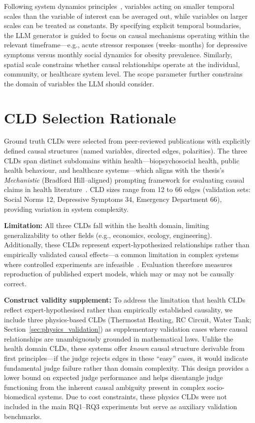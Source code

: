 Following system dynamics principles~\cite{sterman2002system}, variables acting on smaller temporal scales than the variable of interest can be averaged out, while variables on larger scales can be treated as constants. By specifying explicit temporal boundaries, the LLM generator is guided to focus on causal mechanisms operating within the relevant timeframe---e.g., acute stressor responses (weeks--months) for depressive symptoms versus monthly social dynamics for obesity prevalence. Similarly, spatial scale constrains whether causal relationships operate at the individual, community, or healthcare system level. The scope parameter further constrains the domain of variables the LLM should consider.

\section{CLD Selection Rationale}
Ground truth CLDs were selected from peer-reviewed publications with explicitly defined causal structures (named variables, directed edges, polarities). The three CLDs span distinct subdomains within health---biopsychosocial health, public health behaviour, and healthcare systems---which aligns with the thesis's \textit{Mechanistic} (Bradford Hill--aligned) prompting framework for evaluating causal claims in health literature~\citep{shimonovich2020bradford}. CLD sizes range from 12 to 66 edges (validation sets: Social Norms 12, Depressive Symptoms 34, Emergency Department 66), providing variation in system complexity.

\textbf{Limitation:} All three CLDs fall within the health domain, limiting generalizability to other fields (e.g., economics, ecology, engineering). Additionally, these CLDs represent expert-hypothesized relationships rather than empirically validated causal effects---a common limitation in complex systems where controlled experiments are infeasible~\cite{uleman2024triangulation,crielaard2020socialnorms,smeekes2023emergency}. Evaluation therefore measures reproduction of published expert models, which may or may not be causally correct.

\textbf{Construct validity supplement:} To address the limitation that health CLDs reflect expert-hypothesised rather than empirically established causality, we include three physics-based CLDs (Thermostat Heating, RC Circuit, Water Tank; Section~\ref{sec:physics_validation}) as supplementary validation cases where causal relationships are unambiguously grounded in mathematical laws. Unlike the health domain CLDs, these systems offer \emph{known} causal structure derivable from first principles---if the judge rejects edges in these ``easy'' cases, it would indicate fundamental judge failure rather than domain complexity. This design provides a lower bound on expected judge performance and helps disentangle judge functioning from the inherent causal ambiguity present in complex socio-biomedical systems. Due to cost constraints, these physics CLDs were not included in the main RQ1--RQ3 experiments but serve as auxiliary validation benchmarks.

